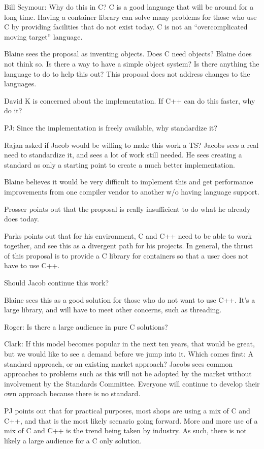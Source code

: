 \documentclass[12pt,a4paper]{memoir} %
\begin{document}
{{Bill Seymour: Why do this in C? C is a good language that will be around for a long time. Having a container library can solve many problems for those who use C by providing facilities that do not exist today. C is not an “overcomplicated moving target” language.

Blaine sees the proposal as inventing objects. Does C need objects? Blaine does not think so. Is there a way to have a simple object system? Is there anything the language to do to help this out? 
This proposal does not address changes to the languages.

David K is concerned about the implementation. If C++ can do this faster, why do it? 

PJ: Since the implementation is freely available, why standardize it?

Rajan asked if Jacob would be willing to make this work a TS? Jacobs sees a real need to standardize it, and sees a lot of work still needed. He sees creating a standard as only a starting point to create a much better implementation.

Blaine believes it would be very difficult to implement this and get performance improvements from one compiler vendor to another w/o having language support.

Prosser points out that the proposal is really insufficient to do what he already does today.

Parks points out that for his environment, C and C++ need to be able to work together, and see this as a divergent path for his projects.
In general, the thrust of this proposal is to provide a C library for containers so that a user does not have to use C++. 

Should Jacob continue this work?\par
Blaine sees this as a good solution for those who do not want to use C++. It’s a large library, and will have to meet other concerns, such as threading.

Roger: Is there a large audience in pure C solutions?

Clark: If this model becomes popular in the next ten years, that would be great, but we would like to see a demand before we jump into it.
Which comes first: A standard approach, or an existing market approach? Jacobs sees common approaches to problems such as this will not be adopted by the market without involvement by the Standards Committee. Everyone will continue to develop their own approach because there is no standard.

PJ points out that for practical purposes, most shops are using a mix of C and C++, and that is the most likely scenario going forward. More and more use of a mix of C and C++ is the trend being taken by industry. As such, there is not likely a large audience for a C only solution.

}}
\end{document}
